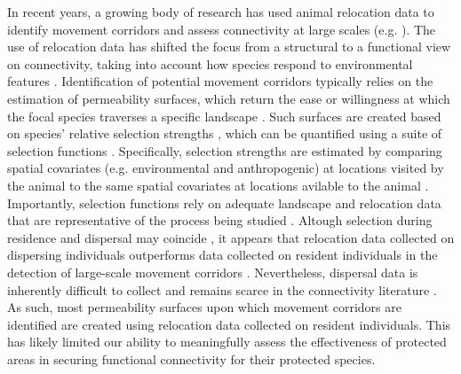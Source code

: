 \documentclass[abstract=on,10pt,a4paper,bibliography=totocnumbered]{article}
\begin{document}
In recent years, a growing body of research has used animal relocation data to
identify movement corridors and assess connectivity at large scales (e.g.
\citealp{Chetkiewicz.2006, Squires.2013, Elliot.2014}). The use of relocation
data has shifted the focus from a structural to a functional view on
connectivity, taking into account how species respond to environmental features
\citep{Taylor.2006, Fattebert.2015}. Identification of
potential movement corridors typically relies on the estimation of permeability
surfaces, which return the ease or willingness at which the focal species
traverses a specific landscape \citep{Sawyer.2011}. Such surfaces are created
based on species' relative selection strengths \citep{Avgar.2017}, which can be quantified using a suite of selection functions
\citep{Zeller.2012}. Specifically, selection strengths  are
estimated by comparing spatial covariates (e.g. environmental and anthropogenic)
at locations visited by the animal to the same spatial covariates at locations
avilable to the animal 
\citep{Zeller.2012}. Importantly, selection functions rely on adequate landscape
and relocation data that are representative of the process being studied
\citep{Diniz.2020}. Altough selection during residence and dispersal may
coincide \citep{Fattebert.2015}, it appears that relocation data collected on dispersing
individuals outperforms data collected on resident individuals in the detection
of large-scale movement corridors \citep{Elliot.2014, Diniz.2020}. Nevertheless,
dispersal data is inherently difficult to collect and remains scarce in the
connectivity literature \citep{Vasudev.2015}. As such, most permeability
surfaces upon which movement corridors are identified are created using
relocation data collected on resident individuals. This has likely limited our
ability to meaningfully assess the effectiveness of protected areas in securing
functional connectivity for their protected species.
\end{document}
